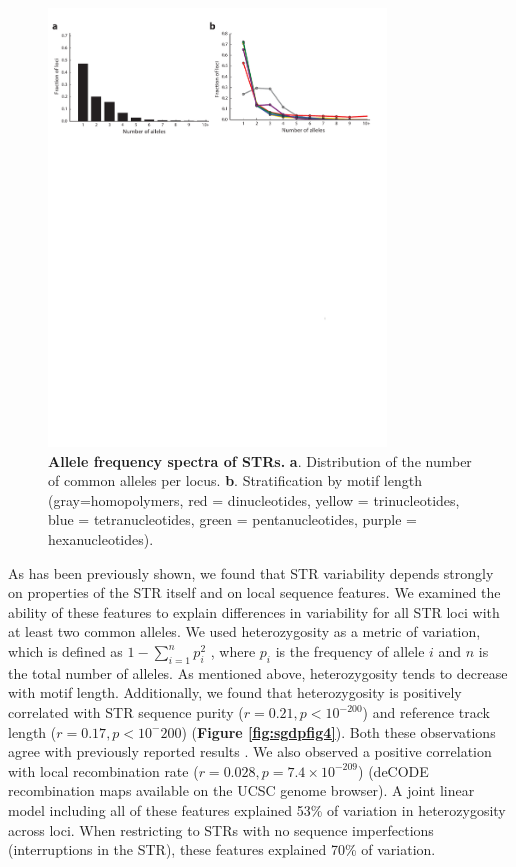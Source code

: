 \begin{figure}[h!]
\centering
\label{fig:sgdpfig3}
\includegraphics[width=0.8\textwidth]{Figures/App3/Fig3.pdf}
\caption{\textbf{Allele frequency spectra of STRs.} \textbf{a}. Distribution of the number of common alleles per locus. \textbf{b}. Stratification by motif length (gray=homopolymers, red = dinucleotides, yellow = trinucleotides, blue = tetranucleotides, green = pentanucleotides, purple = hexanucleotides).}
\end{figure}

As has been previously shown, we found that STR variability depends strongly on properties of the STR itself and on local sequence features. We examined the ability of these features to explain differences in variability for all STR loci with at least two common alleles. We used heterozygosity as a metric of variation, which is defined as $1-\sum_{i=1}^n p_i^2$ , where $p_i$  is the frequency of allele $i$ and $n$ is the total number of alleles. As mentioned above, heterozygosity tends to decrease with motif length. Additionally, we found that heterozygosity is positively correlated with STR sequence purity ($r = 0.21, p<10^{-200}$) and reference track length ($r = 0.17, p<10^-{200}$) (\textbf{Figure \ref{fig:sgdpfig4}}). Both these observations agree with previously reported results \cite{WillemsGymrekHighnamEtAl2014,ODushlaineShields2008}. We also observed a positive correlation with local recombination rate ($r = 0.028, p=7.4\times 10^{-209}$) (deCODE recombination maps \cite{KongGudbjartssonSainzEtAl2002} available on the UCSC genome browser). A joint linear model including all of these features explained 53\% of variation in heterozygosity across loci. When restricting to STRs with no sequence imperfections (interruptions in the STR), these features explained 70\% of variation.


